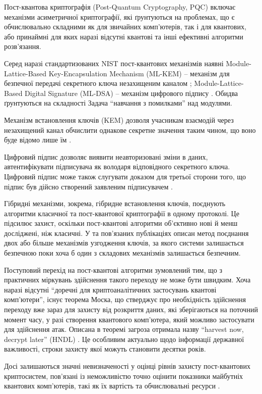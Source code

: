 \documentclass{kpi-lab}
\begin{document}
Пост-квантова криптографія (Post-Quantum Cryptography,
PQC) включає механізми асиметричної криптографії, які
ґрунтуються на проблемах, що є обчислювально складними
як для звичайних комп'ютерів, так і для квантових, або
принаймні для яких наразі відсутні квантові та інші
ефективні алгоритми розв'язання.

Серед наразі стандартизованих NIST пост-квантових механізмів
наявні Module-Lattice-Based
Key-Encapsulation Mechanism (ML-KEM) -- механізм для
безпечної передачі секретного ключа незахищеним каналом
\cite{nist-fips-203};
Module-Lattice-Based Digital Signature (ML-DSA) -- механізм
цифрового підпису \cite{nist-fips-204}.
Обидва ґрунтуються на складності Задача \enquote{навчання з
помилками} над модулями.

Механізм встановлення ключів (KEM) дозволя учасникам
взаємодій через незахищений канал
обчислити однакове секретне значення таким чином, що воно
буде відомо лише їм \cite{nist-fips-203}.

Цифровий підпис дозволяє
виявити неавторизовані зміни в даних,
автентифікувати підписувача як володаря відповідного секретного ключа.
Цифровий підпис може також слугувати доказом для третьої
сторони того, що підпис був дійсно створений заявленим
підписувачем \cite{nist-fips-204}.

Гібридні механізми, зокрема, гібридне встановлення ключів,
поєднують алгоритми класичної та пост-квантової
криптографії в одному протоколі. Це підсилює захист,
оскільки пост-квантові алгоритми об'єктивно нові й менш
досліджені, ніж класичні. У \cite{nist-ir-8547} та
пов'язаних публікаціях
описан метод поєднання двох або більше механізмів
узгодження ключів, за якого системи залишається безпечною
поки хоча б один з складових механізмів залишається безпечним.

Поступовий перехід на пост-квантові алгоритми зумовлений
тим, що з практичних міркувань здійснення такого переходу
не може бути швидким. Хоча наразі відсутні \enquote{доречні
для криптоаналітичних застосувань квантові комп'ютери},
існує теорема Моска, що
стверджує про необхідність здійснення переходу вже зараз
для захисту від розкриття даних, які зберігаються на
поточний момент часу,
у разі створення квантового комп'ютера, який можливо
застосувати для здійснення атак. Описана в теоремі загроза
отримала назву \enquote{harvest now, decrypt later} (HNDL)
\cite[][\pagename 8]{nist-ir-8547}.
Це особливим актуально щодо інформації державної важливості,
строки захисту якої можуть становити десятки років.

Досі залишаються значні невизначеності у оцінці рівнів
захисту пост-квантових криптосистем, пов'язані із
неможливістю точно оцінити показники майбутніх квантових
комп'ютерів, такі як їх вартість та обчислювальні ресурси
\cite{nist-ir-8547}.
\end{document}

